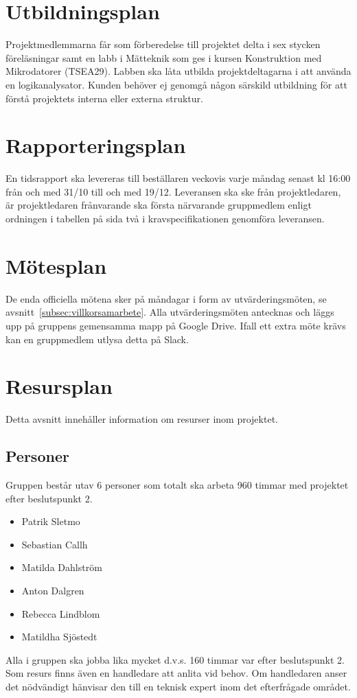 \documentclass{article}
\begin{document}
\section{Utbildningsplan}
Projektmedlemmarna får som förberedelse till projektet delta i sex stycken föreläsningar samt en labb i Mätteknik som ges i kursen Konstruktion med Mikrodatorer (TSEA29). Labben ska låta utbilda projektdeltagarna i att använda en logikanalysator. Kunden behöver ej genomgå någon särskild utbildning för att förstå projektets interna eller externa struktur.

\section{Rapporteringsplan}
En tidsrapport ska levereras till beställaren veckovis varje måndag senast kl 16:00 från och med 31/10 till och med 19/12. Leveransen ska ske från projektledaren, är projektledaren frånvarande ska första närvarande gruppmedlem enligt ordningen i tabellen på sida två i kravspecifikationen genomföra leveransen.

\section{Mötesplan}
De enda officiella mötena sker på måndagar i form av utvärderingsmöten, se avsnitt~\ref{subsec:villkorsamarbete}. Alla utvärderingsmöten antecknas och läggs upp på gruppens gemensamma mapp på Google Drive. Ifall ett extra möte krävs kan en gruppmedlem utlysa detta på Slack.

\section{Resursplan}
Detta avsnitt innehåller information om resurser inom projektet.
\subsection{Personer}
Gruppen består utav 6 personer som totalt ska arbeta 960 timmar med projektet efter beslutspunkt 2.
\begin{itemize}
  \item Patrik Sletmo
  \item Sebastian Callh
  \item Matilda Dahlström
  \item Anton Dalgren
  \item Rebecca Lindblom
  \item Matildha Sjöstedt
\end{itemize}
Alla i gruppen ska jobba lika mycket d.v.s. 160 timmar var efter beslutspunkt 2.
\newline\newline
Som resurs finns även en handledare att anlita vid behov. Om handledaren anser det nödvändigt hänvisar den till en teknisk expert inom det efterfrågade området. 
\end{document}
